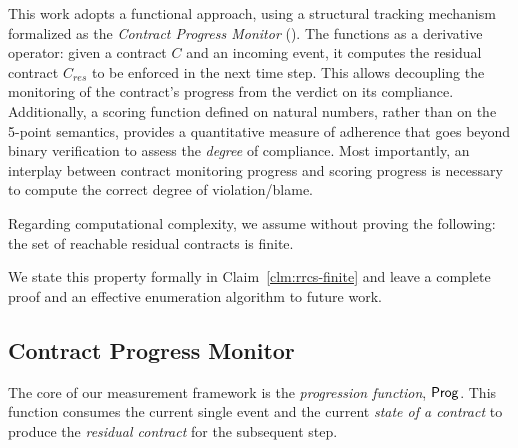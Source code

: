 This work adopts a functional approach, using a structural tracking mechanism formalized as the \emph{Contract Progress Monitor} (\CPM). The \CPM functions as a derivative operator: given a contract $C$ and an incoming event, it computes the residual contract $C_{res}$ to be enforced in the next time step. This allows decoupling the monitoring of the contract's progress from the verdict on its compliance. Additionally, a scoring function defined on natural numbers, rather than on the 5-point semantics, provides a quantitative measure of adherence that goes beyond binary verification to assess the \emph{degree} of compliance. Most importantly, an interplay between contract monitoring progress and scoring progress is necessary to compute the correct degree of violation/blame.

Regarding computational complexity, we assume without proving the following: the set of reachable residual contracts is finite.

We state this property formally in Claim~\ref{clm:rrcs-finite} and leave a complete proof and an effective enumeration algorithm to future work.

\subsection{Contract Progress Monitor}

The core of our measurement framework is the \emph{progression function}, $\mathsf{Prog}$.
This function consumes the current single event and the current \emph{state of a contract} to produce the \emph{residual contract} for the subsequent step.

